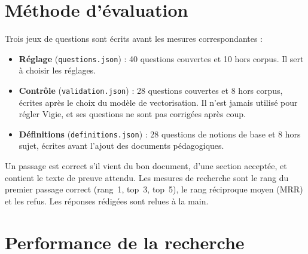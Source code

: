 \documentclass[11pt,a4paper]{article}
\begin{document}
\section{Méthode d'évaluation}

Trois jeux de questions sont écrits avant les mesures correspondantes :
\begin{itemize}
  \item \textbf{Réglage} (\texttt{questions.json}) : 40 questions couvertes et 10 hors corpus. Il sert à choisir les réglages.
  \item \textbf{Contrôle} (\texttt{validation.json}) : 28 questions couvertes et 8 hors corpus, écrites après le choix du modèle de vectorisation. Il n'est jamais utilisé pour régler Vigie, et ses questions ne sont pas corrigées après coup.
  \item \textbf{Définitions} (\texttt{definitions.json}) : 28 questions de notions de base et 8 hors sujet, écrites avant l'ajout des documents pédagogiques.
\end{itemize}
Un passage est correct s'il vient du bon document, d'une section acceptée, et contient le texte de preuve attendu. Les mesures de recherche sont le rang du premier passage correct (rang~1, top~3, top~5), le rang réciproque moyen (MRR) et les refus. Les réponses rédigées sont relues à la main.

\section{Performance de la recherche}
\end{document}
